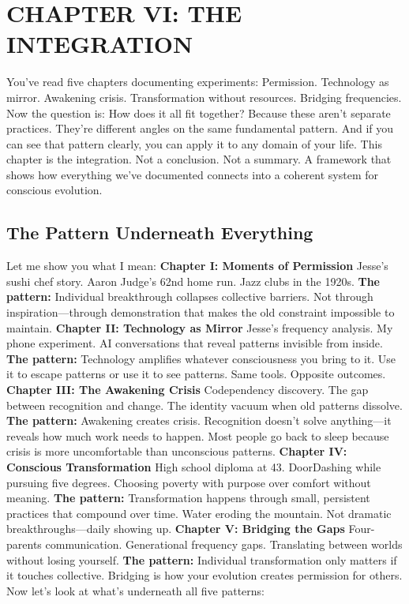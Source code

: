 \documentclass[12pt,openany]{book}
\begin{document}
\cleardoublepage

\chapter{CHAPTER VI: THE INTEGRATION}

You've read five chapters documenting experiments:
Permission. Technology as mirror. Awakening crisis. Transformation without resources. Bridging frequencies.
Now the question is: How does it all fit together?
Because these aren't separate practices. They're different angles on the same fundamental pattern. And if you can see that pattern clearly, you can apply it to any domain of your life.
This chapter is the integration.
Not a conclusion. Not a summary. A framework that shows how everything we've documented connects into a coherent system for conscious evolution.

\section{The Pattern Underneath Everything}

Let me show you what I mean:
\textbf{Chapter I: Moments of Permission}
Jesse's sushi chef story. Aaron Judge's 62nd home run. Jazz clubs in the 1920s.
\textbf{The pattern:} Individual breakthrough collapses collective barriers. Not through inspiration—through demonstration that makes the old constraint impossible to maintain.
\textbf{Chapter II: Technology as Mirror}
Jesse's frequency analysis. My phone experiment. AI conversations that reveal patterns invisible from inside.
\textbf{The pattern:} Technology amplifies whatever consciousness you bring to it. Use it to escape patterns or use it to see patterns. Same tools. Opposite outcomes.
\textbf{Chapter III: The Awakening Crisis}
Codependency discovery. The gap between recognition and change. The identity vacuum when old patterns dissolve.
\textbf{The pattern:} Awakening creates crisis. Recognition doesn't solve anything—it reveals how much work needs to happen. Most people go back to sleep because crisis is more uncomfortable than unconscious patterns.
\textbf{Chapter IV: Conscious Transformation}
High school diploma at 43. DoorDashing while pursuing five degrees. Choosing poverty with purpose over comfort without meaning.
\textbf{The pattern:} Transformation happens through small, persistent practices that compound over time. Water eroding the mountain. Not dramatic breakthroughs—daily showing up.
\textbf{Chapter V: Bridging the Gaps}
Four-parents communication. Generational frequency gaps. Translating between worlds without losing yourself.
\textbf{The pattern:} Individual transformation only matters if it touches collective. Bridging is how your evolution creates permission for others.
Now let's look at what's underneath all five patterns:
\end{document}
